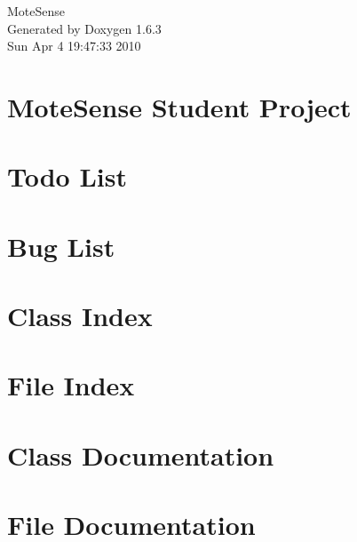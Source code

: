 \documentclass[a4paper]{book}
\begin{document}
\hypersetup{pageanchor=false}
\begin{titlepage}
\vspace*{7cm}
\begin{center}
{\Large MoteSense }\\
\vspace*{1cm}
{\large Generated by Doxygen 1.6.3}\\
\vspace*{0.5cm}
{\small Sun Apr 4 19:47:33 2010}\\
\end{center}
\end{titlepage}
\clearemptydoublepage
{}
\tableofcontents
\clearemptydoublepage
{}
\hypersetup{pageanchor=true}
\chapter{MoteSense Student Project}
\label{index}\hypertarget{index}{}
\chapter{Todo List}
\label{todo}
\hypertarget{todo}{}

\chapter{Bug List}
\label{bug}
\hypertarget{bug}{}

\chapter{Class Index}

\chapter{File Index}

\chapter{Class Documentation}





\chapter{File Documentation}











\printindex
\end{document}
